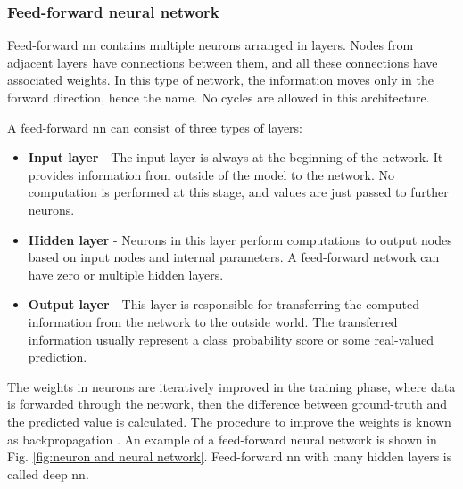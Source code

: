         \subsubsection{Feed-forward neural network}
            Feed-forward \gls{nn} contains multiple neurons arranged in layers. Nodes from adjacent layers have connections between them, and all these connections have associated weights. In this type of network, the information moves only in the forward direction, hence the name. No cycles are allowed in this architecture.
            
            A feed-forward \gls{nn} can consist of three types of layers:
            
            \begin{itemize}
                \item \textbf{Input layer} - The input layer is always at the beginning of the network. It provides information from outside of the model to the network. No computation is performed at this stage, and values are just passed to further neurons.
                \item \textbf{Hidden layer} - Neurons in this layer perform computations to output nodes based on input nodes and internal parameters. A feed-forward network can have zero or multiple hidden layers.
                \item \textbf{Output layer} - This layer is responsible for transferring the computed information from the network to the outside world. The transferred information usually represent a class probability score or some real-valued prediction.
            \end{itemize}
           
            The weights in neurons are iteratively improved in the training phase, where data is forwarded through the network,  then the difference between ground-truth and the predicted value is calculated. The procedure to improve the weights is known as backpropagation \cite{hecht1992theory}.  An example of a feed-forward neural network is shown in Fig. \ref{fig:neuron and neural network}. Feed-forward \gls{nn} with many hidden layers is called deep \gls{nn}.

